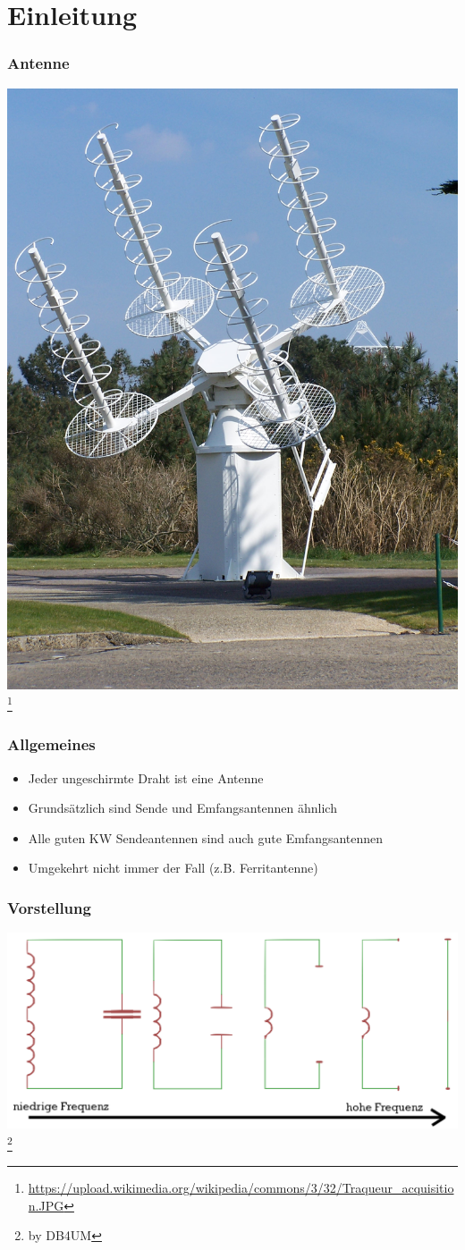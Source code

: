 
\section*{Einleitung}

\begin{frame}
    \frametitle{Antenne}
      \begin{center}
        \includegraphics[width=.5\textwidth]{e11/Traqueur_acquisition.JPG}
        \footnote{\tiny \url{https://upload.wikimedia.org/wikipedia/commons/3/32/Traqueur_acquisition.JPG}}
    \end{center}
\end{frame}
  

\begin{frame}
    \frametitle{Allgemeines}
	\begin{itemize}
		\item Jeder ungeschirmte Draht ist eine Antenne
        \item Grundsätzlich sind Sende und Emfangsantennen ähnlich
        \item Alle guten KW Sendeantennen sind auch gute Emfangsantennen
       	\item Umgekehrt nicht immer der Fall (z.B. Ferritantenne)
    \end{itemize}
\end{frame}

\begin{frame}
    \frametitle{Vorstellung}
    \begin{center}
        \includegraphics[width=1\textwidth]{e11/dipol_entstehung.png}
        \footnote{\tiny by DB4UM}
	\end{center}
\end{frame}

